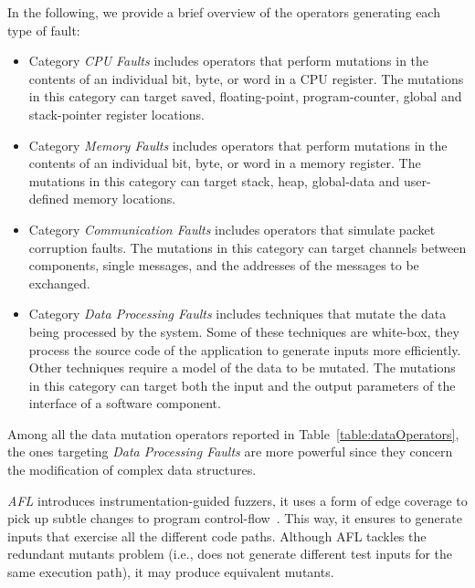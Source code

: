 In the following, we provide a brief overview of the operators generating each type of fault:
\begin{itemize}
	\item Category \emph{CPU Faults} includes operators that perform mutations in the contents of an individual bit, byte, or word in a CPU register. The mutations in this category can target saved, floating-point, program-counter, global and stack-pointer register locations. 
	\item Category \emph{Memory Faults} includes operators that perform mutations in the contents of an individual bit, byte, or word in a memory register. The mutations in this category can target stack, heap, global-data and user-defined memory locations.
	\item Category \emph{Communication Faults} includes operators that simulate packet corruption faults. The mutations in this category can target channels between components, single messages, and the addresses of the messages to be exchanged.
	\item Category \emph{Data Processing Faults} includes techniques that mutate the data being processed by the system. Some of these techniques are white-box, they process the source code of the application to generate inputs more efficiently. Other techniques require a model of the data to be mutated. The mutations in this category can target both the input and the output parameters of the interface of a software component.
\end{itemize}



Among all the data mutation operators reported in Table~\ref{table:dataOperators}, the ones targeting \emph{Data Processing Faults} are more powerful since they concern the modification of complex data structures. %

\emph{AFL} introduces instrumentation-guided fuzzers, it uses a form of edge coverage to pick up subtle changes to program control-flow~\cite{gutmann2016fuzzing}. This way, it ensures to generate inputs that exercise all the different code paths.
Although AFL tackles the redundant mutants problem (i.e., does not generate different test inputs for the same execution path), it may produce equivalent mutants.


